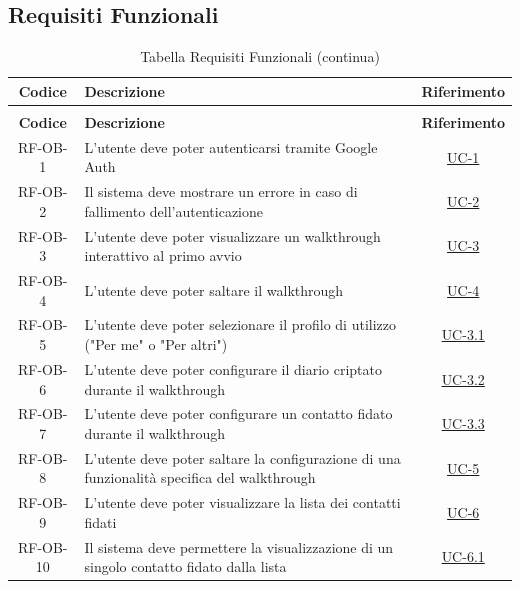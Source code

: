 \documentclass[a4paper,12pt]{article}
\begin{document}
\subsection{Requisiti Funzionali} \label{subsection:requisiti_funzionali}
\begin{center}
\renewcommand{\arraystretch}{1.5}
\begin{longtable}{|c|p{9cm}|c|}
\caption{Tabella Requisiti Funzionali} \label{tab:requisiti_funzionali} \\
\hline
\rowcolor{gray!60}
\textbf{Codice} & \textbf{Descrizione} & \textbf{Riferimento} \\
\hline
\endfirsthead
\caption[]{Tabella Requisiti Funzionali (continua)} \\
\hline
\rowcolor{gray!60}
\textbf{Codice} & \textbf{Descrizione} & \textbf{Riferimento} \\
\hline
\endhead
\rowcolor{white}
RF-OB-1 & L'utente deve poter autenticarsi tramite Google Auth & \hyperref[subsec:UC-1]{UC-1} \\
\hline
\rowcolor{gray!20}
RF-OB-2 & Il sistema deve mostrare un errore in caso di fallimento dell'autenticazione & \hyperref[subsec:UC-2]{UC-2} \\
\hline
\rowcolor{white}
RF-OB-3 & L'utente deve poter visualizzare un walkthrough interattivo al primo avvio & \hyperref[subsec:UC-3]{UC-3} \\
\hline
\rowcolor{gray!20}
RF-OB-4 & L'utente deve poter saltare il walkthrough & \hyperref[subsec:UC-4]{UC-4} \\
\hline
\rowcolor{white}
RF-OB-5 & L'utente deve poter selezionare il profilo di utilizzo ("Per me" o "Per altri") & \hyperref[subsec:UC-3.1]{UC-3.1} \\
\hline
\rowcolor{gray!20}
RF-OB-6 & L'utente deve poter configurare il diario criptato durante il walkthrough & \hyperref[subsec:UC-3.2]{UC-3.2} \\
\hline
\rowcolor{white}
RF-OB-7 & L'utente deve poter configurare un contatto fidato durante il walkthrough & \hyperref[subsec:UC-3.3]{UC-3.3} \\
\hline
\rowcolor{gray!20}
RF-OB-8 & L'utente deve poter saltare la configurazione di una funzionalità specifica del walkthrough & \hyperref[subsec:UC-5]{UC-5} \\
\hline
\rowcolor{white}
RF-OB-9 & L'utente deve poter visualizzare la lista dei contatti fidati & \hyperref[sec:UC-6]{UC-6} \\
\hline
\rowcolor{gray!20}
RF-OB-10 & Il sistema deve permettere la visualizzazione di un singolo contatto fidato dalla lista & \hyperref[subsec:UC-6.1]{UC-6.1} \\

\end{longtable}
\end{center}
\end{document}
